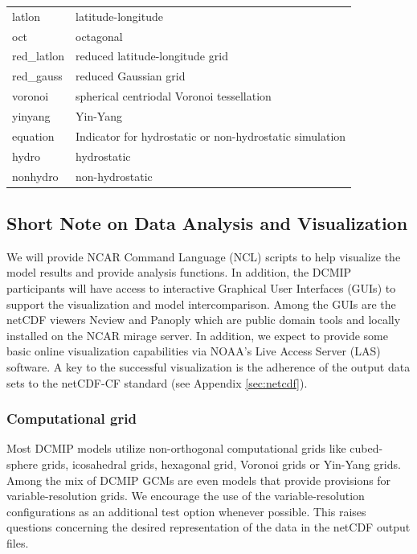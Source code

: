 \documentclass[times,doublespace]{fldauth}
\newcommand\T{\rule{0pt}{2.6ex}}
\newcommand\B{\rule[-1.2ex]{0pt}{0pt}}
\begin{document}
\begin{table}[h]
\begin{tabular*}{\textwidth}{@{\extracolsep{\fill}}ll}
latlon & latitude-longitude \\
oct & octagonal \\
red\_latlon & reduced latitude-longitude grid \\
red\_gauss & reduced Gaussian grid \\
voronoi & spherical centriodal Voronoi tessellation \\
yinyang \B & Yin-Yang \\ \hline
equation \T \B & Indicator for hydrostatic or non-hydrostatic simulation \\  \hline
hydro  \T & hydrostatic \\
nonhydro  \B & non-hydrostatic \\
\hline
\end{tabular*}
\end{table}


\subsection{Short Note on Data Analysis and Visualization}
We will provide NCAR Command Language (NCL) scripts to help visualize the model results and provide analysis functions. In addition, the DCMIP participants will have access to interactive Graphical User Interfaces (GUIs) to support the visualization and model intercomparison. Among the GUIs are the netCDF viewers Ncview and Panoply which are public domain tools and locally installed on the NCAR mirage server. In addition, we expect to provide some basic online visualization capabilities via NOAA's Live Access Server (LAS) software. A key to the successful visualization is the adherence of the output data sets to the netCDF-CF standard (see Appendix \ref{sec:netcdf}).

\subsubsection{Computational grid}
Most DCMIP models utilize non-orthogonal computational grids like cubed-sphere grids, icosahedral grids, hexagonal grid, Voronoi grids or Yin-Yang grids. Among the mix of DCMIP GCMs are even models that provide provisions for variable-resolution grids. We encourage the use of the variable-resolution configurations as an additional test option whenever possible.
This raises questions concerning the desired representation of the data in the netCDF output files. 
\end{document}
